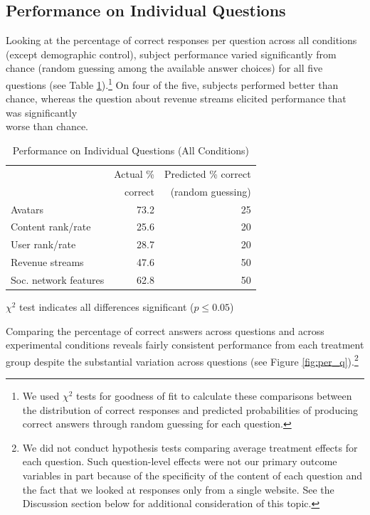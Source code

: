 \documentclass{cscw2010}
\begin{document}
\subsection{Performance on Individual Questions}
Looking at the percentage of correct responses per question across all
conditions (except demographic control), subject performance varied
significantly from chance (random guessing among the available answer
choices) for all five questions (see Table
\ref{table:ind_q_results}).\footnote{We used $\chi^{2}$ tests for
  goodness of fit to calculate these comparisons between the
  distribution of correct responses and predicted probabilities of
  producing correct answers through random guessing for each
  question.} On four of the five, subjects performed better than
chance, whereas the question about revenue streams elicited
performance that was significantly\\ worse than chance.

\begin{table}[ht]					%
\begin{center}						%
\caption{Performance on Individual Questions (All Conditions)} %
\vspace{8pt}
\begin{threeparttable}
\begin{tabular}{@{}l r r@{}}
\toprule
& Actual \% &  Predicted \% correct\\
& correct &  (random guessing) \\
\cmidrule(l){2-3}
Avatars & 73.2 & 25\\ 
Content rank/rate & 25.6 & 20\\
User rank/rate & 28.7 & 20\\
Revenue streams & 47.6 & 50\\
Soc. network features & 62.8 & 50\\
\bottomrule
\end{tabular}
  \begin{tablenotes}[para]
     \small{\item $\chi^{2}$ test indicates all differences significant ($p \leq 0.05$)}
  \end{tablenotes}
\end{threeparttable}
\label{table:ind_q_results}
\end{center}
\end{table}

Comparing the percentage of correct answers across questions and
across experimental conditions reveals fairly consistent performance
from each treatment group despite the substantial variation
across questions (see Figure \ref{fig:per_q}).\footnote{We did not
  conduct hypothesis tests comparing average treatment effects for
  each question. Such question-level effects were not our primary
  outcome variables in part because of the specificity of the content
  of each question and the fact that we looked at responses only from
  a single website. See the Discussion section below for additional
  consideration of this topic.}
\end{document}
